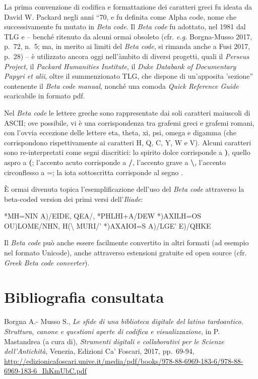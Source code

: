 \documentclass[
  b5paper,
  twoside,
  12pt,
  chapterprefix=false,
  bibliography=totocnumbered,
  parskip=false]{scrbook}
\begin{document}
La prima convenzione di codifica e formattazione dei caratteri greci fu
ideata da David W. Packard negli anni \enquote{70, e fu definita come Alpha
code, nome che successivamente fu mutato in \emph{Beta code}. Il \emph{Beta code}
fu adottato, nel 1981 dal TLG e -- benché ritenuto da alcuni ormai
obsoleto (cfr. \emph{e.g.} Borgna-Musso 2017, p.~72, n.~5; ma, in merito ai
limiti del \emph{Beta code}, si rimanda anche a Fusi 2017, p.~28) -- è
utilizzato ancora oggi nell'àmbito di diversi progetti, quali il
\emph{Perseus Project}, il \emph{Packard Humanities Institute}, il \emph{Duke Databank
of Documentary Papyri et alii}, oltre il summenzionato TLG, che dispone
di un'apposita 'sezione} contenente il \emph{Beta code manual}, nonché una
comoda \emph{Quick Reference Guide} scaricabile in formato pdf.

Nel \emph{Beta code} le lettere greche sono rappresentate dai soli caratteri
maiuscoli di ASCII; ove possibile, vi è una corrispondenza tra grafemi
greci e grafemi romani, con l'ovvia eccezione delle lettere eta, theta,
xi, psi, omega e digamma (che corrispondono rispettivamente ai caratteri
H, Q, C, Y, W e V). Alcuni caratteri sono re-interpretati come segni
diacritici: lo spirito dolce corrisponde a \textbf{)}, quello aspro a \textbf{(};
l'accento acuto corrisponde a \textbf{/}, l'accento grave a \textbf{\textbackslash{}}, l'accento
circonflesso a =; la iota sottoscritta corrisponde al segno \textbar.

È ormai divenuta topica l'esemplificazione dell'uso del \emph{Beta code}
attraverso la beta-coded version dei primi versi dell'\emph{Iliade}:

*MH=NIN A)/EIDE, QEA/, *PHLHI+A/DEW *)AXILH=OS\\
OU)LOME/NHN, H(\textbackslash{} MURI/' *)AXAIOI=S A)/LGE' E)/QHKE

Il \emph{Beta code} può anche essere facilmente convertito in altri formati
(ad esempio nel formato Unicode), anche attraverso estensioni gratuite
ed open source (cfr. \emph{Greek Beta code converter}).

\hypertarget{bibliografia-consultata-2}{%
\section*{Bibliografia consultata}\label{bibliografia-consultata-2}}

Borgna A.- Musso S., \emph{Le sfide di una biblioteca digitale del latino
tardoantico. Struttura, canone e questioni aperte di codifica e
visualizzazione}, in P. Mastandrea (a cura di), \emph{Strumenti digitali e
collaborativi per le Scienze dell'Antichità}, Venezia, Edizioni Ca'
Foscari, 2017, pp.~69-94,
\url{http://edizionicafoscari.unive.it/media/pdf/books/978-88-6969-183-6/978-88-6969-183-6_IhKmUbC.pdf}
\end{document}
